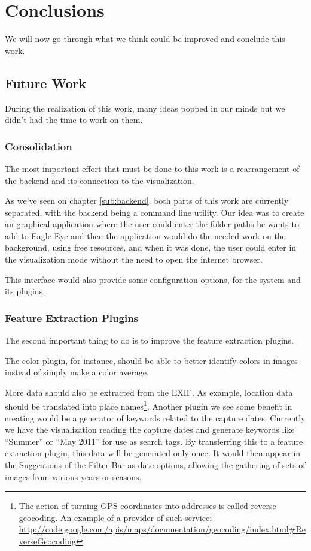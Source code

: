\chapter{Conclusions}
\label{chapter:conclusions}

We will now go through what we think could be improved and conclude this work.


\section{Future Work} %
\label{future_work}

During the realization of this work, many ideas popped in our minds but we didn't had the time to work on them.

\subsection{Consolidation} %
\label{sec:consolidation}

The most important effort that must be done to this work is a rearrangement of the backend and its connection to the visualization.

As we've seen on chapter \ref{sub:backend}, both parts of this work are currently separated, with the backend being a command line utility. Our idea was to create an graphical application where the user could enter the folder paths he wants to add to Eagle Eye and then the application would do the needed work on the background, using free resources, and when it was done, the user could enter in the visualization mode without the need to open the internet browser.

This interface would also provide some configuration options, for the system and its plugins.



\subsection{Feature Extraction Plugins} %
\label{sec:feature_extraction}

The second important thing to do is to improve the feature extraction plugins.

The color plugin, for instance, should be able to better identify colors in images instead of simply make a color average.

More data should also be extracted from the EXIF. As example, location data should be translated into place names\footnote{The action of turning GPS coordinates into addresses is called reverse geocoding. An example of a provider of such service: \url{http://code.google.com/apis/maps/documentation/geocoding/index.html\#ReverseGeocoding}}. Another plugin we see some benefit in creating would be a generator of keywords related to the capture dates. Currently we have the visualization reading the capture dates and generate keywords like ``Summer'' or ``May 2011'' for use as search tags. By transferring this to a feature extraction plugin, this data will be generated only once. It would then appear in the Suggestions of the Filter Bar as date options, allowing the gathering of sets of images from various years or seasons.

